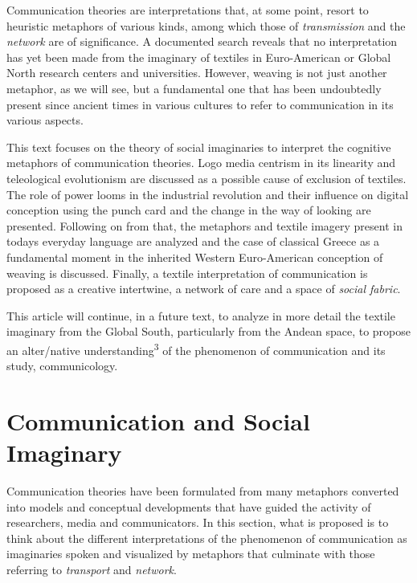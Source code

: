 \documentclass{tufte-handout}
\begin{document}
Communication theories are interpretations that, at some point, resort
to heuristic metaphors of various kinds, among which those of
\emph{transmission} and the \emph{network} are of significance. A
documented search reveals that no interpretation has yet been made from
the imaginary of textiles in Euro-American or Global North research
centers and universities. However, weaving is not just another metaphor,
as we will see, but a fundamental one that has been undoubtedly present
since ancient times in various cultures to refer to communication in its
various aspects.

This text focuses on the theory of social imaginaries to interpret the
cognitive metaphors of communication theories. Logo media centrism in
its linearity and teleological evolutionism are discussed as a possible
cause of exclusion of textiles. The role of power looms in the
industrial revolution and their influence on digital conception using
the punch card and the change in the way of looking are presented.
Following on from that, the metaphors and textile imagery present in
today\textquotesingle s everyday language are analyzed and the case of
classical Greece as a fundamental moment in the inherited Western
Euro-American conception of weaving is discussed. Finally, a textile
interpretation of communication is proposed as a creative intertwine, a
network of care and a space of \emph{social fabric}.

This article will continue, in a future text, to analyze in more detail
the textile imaginary from the Global South, particularly from the
Andean space, to propose an alter/native understanding\textsuperscript{3} of the phenomenon of
communication and its study, communicology.

\hypertarget{communication-and-social-imaginary}{%
\section{Communication and Social
Imaginary}\label{communication-and-social-imaginary}}

Communication theories have been formulated from many metaphors
converted into models and conceptual developments that have guided the
activity of researchers, media and communicators. In this section, what
is proposed is to think about the different interpretations of the
phenomenon of communication as imaginaries spoken and visualized by
metaphors that culminate with those referring to \emph{transport} and
\emph{network}.
\end{document}
